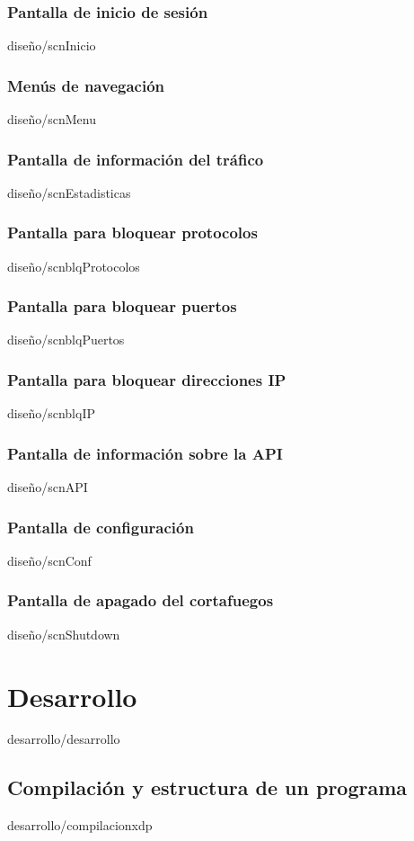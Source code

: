 \documentclass[epsbased,copyright,final,printable,covers,extendedindex,firstnumbered,tfg,gnuplot]{tfgtfmthesisuam}
\begin{document}
    \subsection{Pantalla de inicio de sesión\label{SEC:scnInicio}}{diseño/scnInicio}
    \subsection{Menús de navegación\label{SEC:scnMenu}}{diseño/scnMenu}
    \subsection{Pantalla de información del tráfico\label{SEC:scnEstadisticas}}{diseño/scnEstadisticas}
    \subsection{Pantalla para bloquear protocolos\label{SEC:scnblqProtocolos}}{diseño/scnblqProtocolos}
    \subsection{Pantalla para bloquear puertos\label{SEC:scnblqPuertos}}{diseño/scnblqPuertos}
    \subsection{Pantalla para bloquear direcciones IP\label{SEC:scnblqIP}}{diseño/scnblqIP}
    \subsection{Pantalla de información sobre la API\label{SEC:scnAPI}}{diseño/scnAPI}
    \subsection{Pantalla de configuración\label{SEC:scnConf}}{diseño/scnConf}
    \subsection{Pantalla de apagado del cortafuegos\label{SEC:scnShutdown}}{diseño/scnShutdown}
    
    
    
    
\chapter{Desarrollo\label{CAP:DESARROLLO}}{desarrollo/desarrollo}
    \section{Compilación y estructura de un programa\label{SEC:COMPILACIONXDP}}{desarrollo/compilacionxdp}
\end{document}

